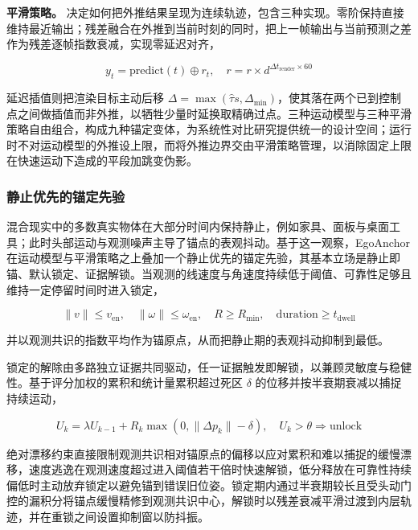 \documentclass[review]{vgtc}
\begin{document}
\textbf{平滑策略。} 决定如何把外推结果呈现为连续轨迹，包含三种实现。零阶保持直接维持最近输出；残差融合在外推到当前时刻的同时，把上一帧输出与当前预测之差作为残差逐帧指数衰减，实现零延迟对齐，

\begin{equation}
y_t = \mathrm{predict}(t) \oplus r_t, \quad r = r \times d^{\Delta t_{\mathrm{render}} \times 60}
\label{eq:blend}
\end{equation}


延迟插值则把渲染目标主动后移 $\Delta = \max\!\left(\widehat{\tau} s, \Delta_{\mathrm{min}}\right)$，使其落在两个已到控制点之间做插值而非外推，以牺牲少量时延换取精确过点。三种运动模型与三种平滑策略自由组合，构成九种锚定变体，为系统性对比研究提供统一的设计空间；运行时不对运动模型的外推设上限，而将外推边界交由平滑策略管理，以消除固定上限在快速运动下造成的平段加跳变伪影。

\subsubsection{静止优先的锚定先验}\label{sec:staticlock}


混合现实中的多数真实物体在大部分时间内保持静止，例如家具、面板与桌面工具；此时头部运动与观测噪声主导了锚点的表观抖动。基于这一观察，EgoAnchor 在运动模型与平滑策略之上叠加一个静止优先的锚定先验，其基本立场是静止即锚、默认锁定、证据解锁。当观测的线速度与角速度持续低于阈值、可靠性足够且维持一定停留时间时进入锁定，

\begin{equation}
\lVert v \rVert \leq v_{\mathrm{en}}, \quad \lVert \omega \rVert \leq \omega_{\mathrm{en}}, \quad R \geq R_{\mathrm{min}}, \quad \mathrm{duration} \geq t_{\mathrm{dwell}}
\label{eq:lockenter}
\end{equation}


并以观测共识的指数平均作为锚原点，从而把静止期的表观抖动抑制到最低。

锁定的解除由多路独立证据共同驱动，任一证据触发即解锁，以兼顾灵敏度与稳健性。基于评分加权的累积和统计量累积超过死区 $\delta$ 的位移并按半衰期衰减以捕捉持续运动，

\begin{equation}
U_k = \lambda U_{k - 1} + R_k \max\!\left(0, \lVert \Delta p_k \rVert - \delta\right), \quad U_k > \theta \Rightarrow \mathrm{unlock}
\label{eq:cusum}
\end{equation}


绝对漂移约束直接限制观测共识相对锚原点的偏移以应对累积和难以捕捉的缓慢漂移，速度逃逸在观测速度超过进入阈值若干倍时快速解锁，低分释放在可靠性持续偏低时主动放弃锁定以避免锚到错误旧位姿。锁定期内通过半衰期较长且受头动门控的漏积分将锚点缓慢精修到观测共识中心，解锁时以残差衰减平滑过渡到内层轨迹，并在重锁之间设置抑制窗以防抖振。
\end{document}
